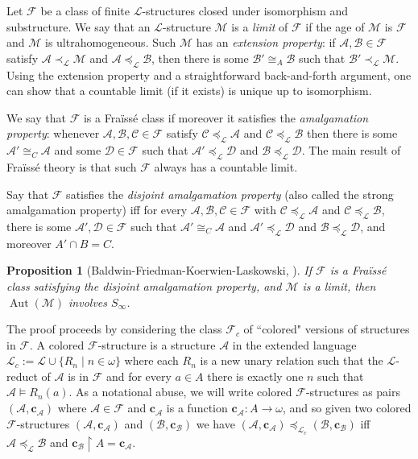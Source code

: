 \documentclass[12pt]{amsart}
\theoremstyle{plain}
\newtheorem{proposition}[theorem]{Proposition}
\theoremstyle{definition}
\newcommand{\isom}{\cong}
\newcommand{\mcA}{\mathcal{A}}
\newcommand{\mcB}{\mathcal{B}}
\newcommand{\mcC}{\mathcal{C}}
\newcommand{\mcD}{\mathcal{D}}
\newcommand{\mcF}{\mathcal{F}}
\newcommand{\mcL}{\mathcal{L}}
\newcommand{\mcM}{\mathcal{M}}
\newcommand{\oc}{\mathbf{c}}
\DeclareMathOperator{\Aut}{Aut}
\begin{document}
Let $\mcF$ be a class of finite $\mcL$-structures closed under isomorphism and substructure.
We say that an $\mcL$-structure $\mcM$ is a \emph{limit} of $\mcF$ if the age of $\mcM$ is $\mcF$ and $\mcM$ is ultrahomogeneous.
Such $\mcM$ has an \emph{extension property}: if $\mcA, \mcB \in \mcF$ satisfy $\mcA \prec_\mcL \mcM$ and $\mcA \preceq_\mcL \mcB$, then there is some $\mcB' \isom_A \mcB$ such that $\mcB' \prec_\mcL \mcM$.
Using the extension property and a straightforward back-and-forth argument, one can show that a countable limit (if it exists) is unique up to isomorphism.

We say that $\mcF$ is a Fra\"{i}ss\'{e} class if moreover it satisfies the \emph{amalgamation property}: whenever $\mcA, \mcB, \mcC \in \mcF$ satisfy $\mcC \preceq_\mcL \mcA$ and $\mcC \preceq_\mcL \mcB$ then there is some $\mcA' \isom_C \mcA$ and some $\mcD \in \mcF$ such that $\mcA' \preceq_\mcL \mcD$ and $\mcB \preceq_\mcL \mcD$.
The main result of Fra\"{i}ss\'{e} theory is that such $\mcF$ always has a countable limit.

Say that $\mcF$ satisfies the \emph{disjoint amalgamation property} (also called the strong amalgamation property) iff for every $\mcA, \mcB, \mcC \in \mcF$ with $\mcC \preceq_\mcL \mcA$ and $\mcC \preceq_\mcL \mcB$, there is some $\mcA', \mcD \in \mcF$ such that $\mcA' \isom_C \mcA$ and $\mcA' \preceq_\mcL \mcD$ and $\mcB \preceq_\mcL \mcD$, and moreover $A' \cap B = C$.

\begin{proposition}[Baldwin-Friedman-Koerwien-Laskowski, \cite{BFKL2016}]\label{prop:bfkl}
If $\mcF$ is a Fra\"{i}ss\'{e} class satisfying the disjoint amalgamation property, and $\mcM$ is a limit, then $\Aut(\mcM)$ involves $S_\infty$.
\end{proposition}

The proof proceeds by considering the class $\mcF_c$ of ``colored" versions of structures in $\mcF$.
A colored $\mcF$-structure is a structure $\mcA$ in the extended language $\mcL_c := \mcL \cup \{R_n \mid n \in \omega\}$ where each $R_n$ is a new unary relation such that the $\mcL$-reduct of $\mcA$ is in $\mcF$ and for every $a \in A$ there is exactly one $n$ such that $\mcA \models R_n(a)$.
As a notational abuse, we will write colored $\mcF$-structures as pairs $(\mcA, \oc_\mcA)$ where $\mcA \in \mcF$ and $\oc_\mcA$ is a function $\oc_\mcA : A \rightarrow \omega$, and so given two colored $\mcF$-structures $(\mcA, \oc_\mcA)$ and $(\mcB, \oc_\mcB)$ we have $(\mcA, \oc_\mcA) \preceq_{\mcL_c} (\mcB, \oc_\mcB)$ iff $\mcA \preceq_\mcL \mcB$ and $\oc_\mcB \upharpoonright A = \oc_\mcA$.
\end{document}
